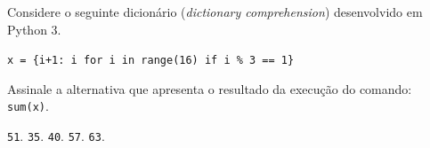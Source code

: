 
{%

\item \rtask \ponto{\pt} 
Considere o seguinte dicionário (\textit{dictionary comprehension}) desenvolvido em Python 3.

\lstinline[style=Python]|x = {i+1: i for i in range(16) if i % 3 == 1}|

Assinale a alternativa que apresenta o resultado da execução do comando: \lstinline[style=Python]|sum(x)|.

\begin{answerlist}[label={\texttt{\Alph*}.},leftmargin=*]
    \ti \lstinline[style=Python]|51|.
    \ti \lstinline[style=Python]|35|.
    \di \lstinline[style=Python]|40|.
    \ti \lstinline[style=Python]|57|.
    \ti \lstinline[style=Python]|63|.
\end{answerlist}
}

